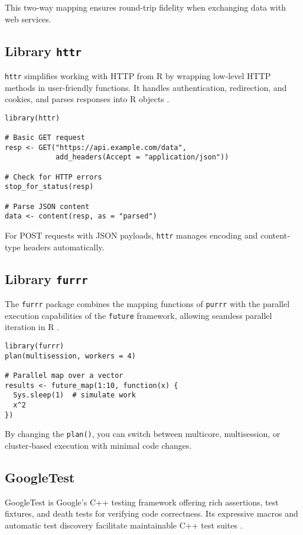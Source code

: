 This two-way mapping ensures round-trip fidelity when exchanging data with web services.

\subsection{Library \texttt{httr}}

\texttt{httr} simplifies working with HTTP from R by wrapping low‐level HTTP methods in user-friendly functions. It handles authentication, redirection, and cookies, and parses responses into R objects \cite{wickham2011httr}.

\begin{verbatim}
library(httr)

# Basic GET request
resp <- GET("https://api.example.com/data",
            add_headers(Accept = "application/json"))

# Check for HTTP errors
stop_for_status(resp)

# Parse JSON content
data <- content(resp, as = "parsed")
\end{verbatim}

For POST requests with JSON payloads, \texttt{httr} manages encoding and content‐type headers automatically.

\subsection{Library \texttt{furrr}}

The \texttt{furrr} package combines the mapping functions of \texttt{purrr} with the parallel execution capabilities of the \texttt{future} framework, allowing seamless parallel iteration in R \cite{Vaughan2020furrr}.

\begin{verbatim}
library(furrr)
plan(multisession, workers = 4)

# Parallel map over a vector
results <- future_map(1:10, function(x) {
  Sys.sleep(1)  # simulate work
  x^2
})
\end{verbatim}

By changing the \texttt{plan()}, you can switch between multicore, multisession, or cluster‐based execution with minimal code changes.

\subsection{GoogleTest}

GoogleTest is Google’s C++ testing framework offering rich assertions, test fixtures, and death tests for verifying code correctness. Its expressive macros and automatic test discovery facilitate maintainable C++ test suites \cite{google2023gtest}.

